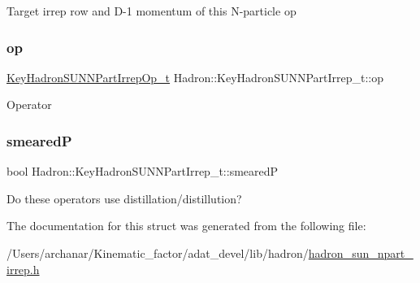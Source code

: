 Target irrep row and D-\/1 momentum of this N-\/particle op \mbox{\label{structHadron_1_1KeyHadronSUNNPartIrrep__t_ae502e15ab768c7d2dd40b79672d0c0b0}} 
\subsubsection{\texorpdfstring{op}{op}}
{\footnotesize\ttfamily \mbox{\hyperlink{structHadron_1_1KeyHadronSUNNPartIrrepOp__t}{Key\+Hadron\+S\+U\+N\+N\+Part\+Irrep\+Op\+\_\+t}} Hadron\+::\+Key\+Hadron\+S\+U\+N\+N\+Part\+Irrep\+\_\+t\+::op}

Operator \mbox{\label{structHadron_1_1KeyHadronSUNNPartIrrep__t_ae27b069e7cc2139fcf1e9e847c163f38}} 
\subsubsection{\texorpdfstring{smearedP}{smearedP}}
{\footnotesize\ttfamily bool Hadron\+::\+Key\+Hadron\+S\+U\+N\+N\+Part\+Irrep\+\_\+t\+::smearedP}

Do these operators use distillation/distillution? 

The documentation for this struct was generated from the following file\+:\begin{DoxyCompactItemize}
\item 
/\+Users/archanar/\+Kinematic\+\_\+factor/adat\+\_\+devel/lib/hadron/\mbox{\hyperlink{lib_2hadron_2hadron__sun__npart__irrep_8h}{hadron\+\_\+sun\+\_\+npart\+\_\+irrep.\+h}}\end{DoxyCompactItemize}

